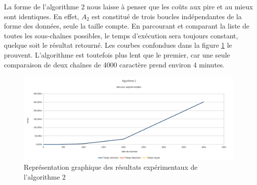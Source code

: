 La forme de l'algorithme 2 nous laisse à penser que les coûts aux pire et au mieux sont identiques. En effet, $A_2$ est constitué de trois boucles indépendantes de la forme des données, seule la taille compte. En parcourant et comparant la liste de toutes les sous-chaînes possibles, le temps d'exécution sera toujours constant, quelque soit le résultat retourné.
Les courbes confondues dans la figure \ref{graphalgo2} le prouvent. L'algorithme est toutefois plus lent que le premier, car une seule comparaison de deux chaînes de 4000 caractère prend environ 4 minutes.


\begin{figure}[p]
  \includegraphics[width=\textwidth]{expe_algo2}
  \caption{Représentation graphique des résultats expérimentaux de l'algorithme 2}
    \label{graphalgo2}
\end{figure}

